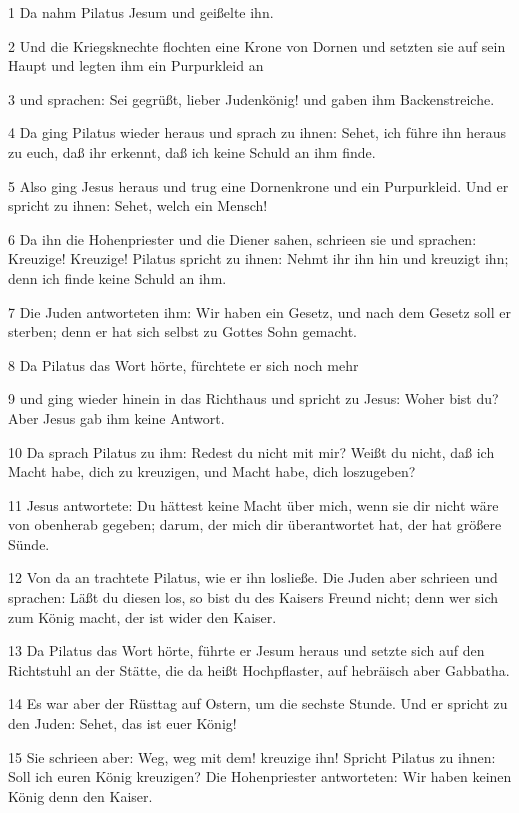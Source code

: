 \par 1 Da nahm Pilatus Jesum und geißelte ihn.
\par 2 Und die Kriegsknechte flochten eine Krone von Dornen und setzten sie auf sein Haupt und legten ihm ein Purpurkleid an
\par 3 und sprachen: Sei gegrüßt, lieber Judenkönig! und gaben ihm Backenstreiche.
\par 4 Da ging Pilatus wieder heraus und sprach zu ihnen: Sehet, ich führe ihn heraus zu euch, daß ihr erkennt, daß ich keine Schuld an ihm finde.
\par 5 Also ging Jesus heraus und trug eine Dornenkrone und ein Purpurkleid. Und er spricht zu ihnen: Sehet, welch ein Mensch!
\par 6 Da ihn die Hohenpriester und die Diener sahen, schrieen sie und sprachen: Kreuzige! Kreuzige! Pilatus spricht zu ihnen: Nehmt ihr ihn hin und kreuzigt ihn; denn ich finde keine Schuld an ihm.
\par 7 Die Juden antworteten ihm: Wir haben ein Gesetz, und nach dem Gesetz soll er sterben; denn er hat sich selbst zu Gottes Sohn gemacht.
\par 8 Da Pilatus das Wort hörte, fürchtete er sich noch mehr
\par 9 und ging wieder hinein in das Richthaus und spricht zu Jesus: Woher bist du? Aber Jesus gab ihm keine Antwort.
\par 10 Da sprach Pilatus zu ihm: Redest du nicht mit mir? Weißt du nicht, daß ich Macht habe, dich zu kreuzigen, und Macht habe, dich loszugeben?
\par 11 Jesus antwortete: Du hättest keine Macht über mich, wenn sie dir nicht wäre von obenherab gegeben; darum, der mich dir überantwortet hat, der hat größere Sünde.
\par 12 Von da an trachtete Pilatus, wie er ihn losließe. Die Juden aber schrieen und sprachen: Läßt du diesen los, so bist du des Kaisers Freund nicht; denn wer sich zum König macht, der ist wider den Kaiser.
\par 13 Da Pilatus das Wort hörte, führte er Jesum heraus und setzte sich auf den Richtstuhl an der Stätte, die da heißt Hochpflaster, auf hebräisch aber Gabbatha.
\par 14 Es war aber der Rüsttag auf Ostern, um die sechste Stunde. Und er spricht zu den Juden: Sehet, das ist euer König!
\par 15 Sie schrieen aber: Weg, weg mit dem! kreuzige ihn! Spricht Pilatus zu ihnen: Soll ich euren König kreuzigen? Die Hohenpriester antworteten: Wir haben keinen König denn den Kaiser.
